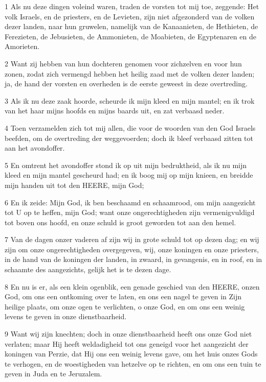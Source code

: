 \par 1 Als nu deze dingen voleind waren, traden de vorsten tot mij toe, zeggende: Het volk Israels, en de priesters, en de Levieten, zijn niet afgezonderd van de volken dezer landen, naar hun gruwelen, namelijk van de Kanaanieten, de Hethieten, de Ferezieten, de Jebusieten, de Ammonieten, de Moabieten, de Egyptenaren en de Amorieten.
\par 2 Want zij hebben van hun dochteren genomen voor zichzelven en voor hun zonen, zodat zich vermengd hebben het heilig zaad met de volken dezer landen; ja, de hand der vorsten en overheden is de eerste geweest in deze overtreding.
\par 3 Als ik nu deze zaak hoorde, scheurde ik mijn kleed en mijn mantel; en ik trok van het haar mijns hoofds en mijns baards uit, en zat verbaasd neder.
\par 4 Toen verzamelden zich tot mij allen, die voor de woorden van den God Israels beefden, om de overtreding der weggevoerden; doch ik bleef verbaasd zitten tot aan het avondoffer.
\par 5 En omtrent het avondoffer stond ik op uit mijn bedruktheid, als ik nu mijn kleed en mijn mantel gescheurd had; en ik boog mij op mijn knieen, en breidde mijn handen uit tot den HEERE, mijn God;
\par 6 En ik zeide: Mijn God, ik ben beschaamd en schaamrood, om mijn aangezicht tot U op te heffen, mijn God; want onze ongerechtigheden zijn vermenigvuldigd tot boven ons hoofd, en onze schuld is groot geworden tot aan den hemel.
\par 7 Van de dagen onzer vaderen af zijn wij in grote schuld tot op dezen dag; en wij zijn om onze ongerechtigheden overgegeven, wij, onze koningen en onze priesters, in de hand van de koningen der landen, in zwaard, in gevangenis, en in roof, en in schaamte des aangezichts, gelijk het is te dezen dage.
\par 8 En nu is er, als een klein ogenblik, een genade geschied van den HEERE, onzen God, om ons een ontkoming over te laten, en ons een nagel te geven in Zijn heilige plaats, om onze ogen te verlichten, o onze God, en om ons een weinig levens te geven in onze dienstbaarheid.
\par 9 Want wij zijn knechten; doch in onze dienstbaarheid heeft ons onze God niet verlaten; maar Hij heeft weldadigheid tot ons geneigd voor het aangezicht der koningen van Perzie, dat Hij ons een weinig levens gave, om het huis onzes Gods te verhogen, en de woestigheden van hetzelve op te richten, en om ons een tuin te geven in Juda en te Jeruzalem.
